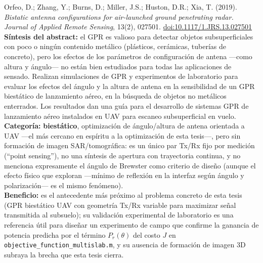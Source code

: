 \documentclass[11pt,a4paper]{article}
\begin{document}
\begin{enumerate}[label=\textbf{[E\arabic*]}, leftmargin=2.2cm, itemsep=10pt]
\item Orfeo, D.; Zhang, Y.; Burns, D.; Miller, J.S.; Huston, D.R.; Xia, T.
(2019). \textit{Bistatic antenna configurations for air-launched ground
penetrating radar.} \emph{Journal of Applied Remote Sensing}, 13(2),
027501. \href{https://doi.org/10.1117/1.JRS.13.027501}{doi:10.1117/1.JRS.13.027501}
\cite{orfeo2019}\\
\textbf{Síntesis del abstract:} el GPR es valioso para detectar objetos
subsuperficiales con poco o ningún contenido metálico (plásticos,
cerámicas, tuberías de concreto), pero los efectos de los parámetros de
configuración de antena —como altura y ángulo— no están bien estudiados
para todas las aplicaciones de sensado. Realizan simulaciones de GPR y
experimentos de laboratorio para evaluar los efectos del ángulo y la
altura de antena en la sensibilidad de un GPR biestático de lanzamiento
aéreo, en la búsqueda de objetos no metálicos enterrados. Los resultados
dan una guía para el desarrollo de sistemas GPR de lanzamiento aéreo
instalados en UAV para escaneo subsuperficial en vuelo.\\
\textbf{Categoría:} \textbf{biestático}, optimización de ángulo/altura de
antena orientada a UAV —el más cercano en espíritu a la optimización de
esta tesis—, pero sin formación de imagen SAR/tomográfica: es un único par
Tx/Rx fijo por medición (``point sensing''), no una síntesis de apertura
con trayectoria continua, y no menciona expresamente el ángulo de Brewster
como criterio de diseño (aunque el efecto físico que exploran —mínimo de
reflexión en la interfaz según ángulo y polarización— es el mismo
fenómeno).\\
\textbf{Beneficio:} es el antecedente más próximo al problema concreto de
esta tesis (GPR biestático UAV con geometría Tx/Rx variable para maximizar
señal transmitida al subsuelo); su validación experimental de laboratorio
es una referencia útil para diseñar un experimento de campo que confirme
la ganancia de potencia predicha por el término $P_r(\theta)$ del costo
$J$ en \texttt{objective\_function\_multislab.m}, y su ausencia de
formación de imagen 3D subraya la brecha que esta tesis cierra.

\end{enumerate}
\end{document}
